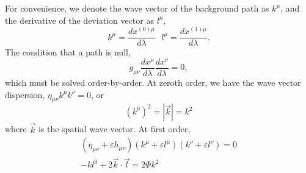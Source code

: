 For convenience, we denote the wave vector of the background path as $k^{\mu}$, and the derivative of the deviation vector as $l^\mu$,
\begin{equation}
    k^{\mu} = \frac{dx^{(0)\mu}}{d\lambda} \ \ \ l^{\mu} = \frac{dx^{(1)\mu}}{d\lambda}.
\end{equation}
The condition that a path is null,
\begin{equation}
    g_{\mu\nu}\frac{dx^{\mu}}{d\lambda}\frac{dx^{\nu}}{d\lambda} = 0,
\end{equation}
which must be solved order-by-order. At zeroth order, we have the wave vector dispersion, $\eta_{\mu\nu}k^{\mu}k^{\nu}=0$, or
\begin{equation}
    (k^{0})^2 =|\vec{k}| = k^2
\end{equation}
where $\vec{k}$ is the spatial wave vector. At first order, 
\begin{eqnarray}
    (\eta_{\mu\nu} + \varepsilon h_{\mu\nu})(k^{\mu} + \varepsilon l^{\mu})(k^{\nu} + \varepsilon l^{\nu})=0\nonumber\\
    -kl^0 + 2\vec{k}\cdot\vec{l} = 2\Phi k^2
\end{eqnarray} 